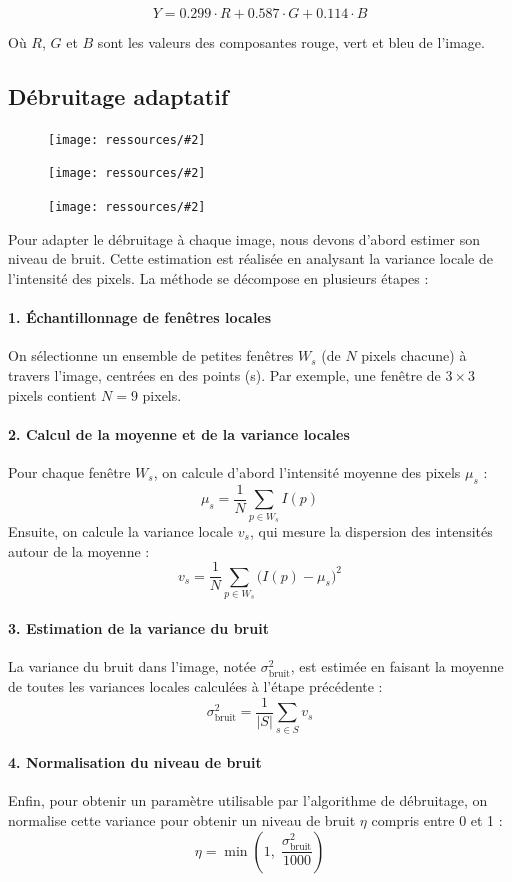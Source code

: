 \documentclass{article}
\newcommand{\stepimage}[3][0.3\textwidth]{%
  \minipage{#1}
    \texttt{[image: ressources/\#2]}
    \caption{#3}
  \endminipage\hfill
}
\begin{document}
\[
Y = 0.299 \cdot R + 0.587 \cdot G + 0.114 \cdot B
\]

Où $R$, $G$ et $B$ sont les valeurs des composantes rouge, vert et bleu de l'image.


\subsection{Débruitage adaptatif}
\begin{figure}[!htb]
    \stepimage[0.30\textwidth]{1step_02_adaptive_denoise.png}{}
    \stepimage[0.33\textwidth]{2step_02_adaptive_denoise.png}{}
    \stepimage[0.26\textwidth]{3step_02_adaptive_denoise.png}{}
\end{figure}
Pour adapter le débruitage à chaque image, nous devons d'abord estimer son niveau de bruit. Cette estimation est réalisée en analysant la variance locale de l'intensité des pixels. La méthode se décompose en plusieurs étapes :

\paragraph{1. Échantillonnage de fenêtres locales}
On sélectionne un ensemble de petites fenêtres \(W_s\) (de \(N\) pixels chacune) à travers l'image, centrées en des points (s). Par exemple, une fenêtre de \(3 \times 3\) pixels contient \(N=9\) pixels.

\paragraph{2. Calcul de la moyenne et de la variance locales}
Pour chaque fenêtre \(W_s\), on calcule d'abord l'intensité moyenne des pixels \(\mu_s\) :
\[
\mu_s = \frac{1}{N} \sum_{p \in W_s} I(p)
\]
Ensuite, on calcule la variance locale \(v_s\), qui mesure la dispersion des intensités autour de la moyenne :
\[
v_s = \frac{1}{N} \sum_{p \in W_s} \big(I(p) - \mu_s\big)^2
\]

\paragraph{3. Estimation de la variance du bruit}
La variance du bruit dans l'image, notée \(\sigma_{\text{bruit}}^{2}\), est estimée en faisant la moyenne de toutes les variances locales calculées à l'étape précédente :
\[
\sigma_{\text{bruit}}^{2} = \frac{1}{|S|} \sum_{s \in S} v_s
\]

\paragraph{4. Normalisation du niveau de bruit}
Enfin, pour obtenir un paramètre utilisable par l'algorithme de débruitage, on normalise cette variance pour obtenir un niveau de bruit \(\eta\) compris entre 0 et 1 :
\[
\eta = \min\!\left(1, \; \frac{\sigma_{\text{bruit}}^{2}}{1000}\right)
\]
\end{document}
